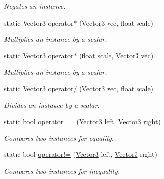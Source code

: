\begin{DoxyCompactItemize}
\begin{DoxyCompactList}\small\item\em Negates an instance. \end{DoxyCompactList}\item 
static \hyperlink{struct_open_t_k_1_1_vector3}{Vector3} \hyperlink{struct_open_t_k_1_1_vector3_a5d752504aac425f88d549e58d71bade2}{operator$\ast$} (\hyperlink{struct_open_t_k_1_1_vector3}{Vector3} vec, float scale)
\begin{DoxyCompactList}\small\item\em Multiplies an instance by a scalar. \end{DoxyCompactList}\item 
static \hyperlink{struct_open_t_k_1_1_vector3}{Vector3} \hyperlink{struct_open_t_k_1_1_vector3_a1fb5158fe548f531205fa3c2f7dff5c3}{operator$\ast$} (float scale, \hyperlink{struct_open_t_k_1_1_vector3}{Vector3} vec)
\begin{DoxyCompactList}\small\item\em Multiplies an instance by a scalar. \end{DoxyCompactList}\item 
static \hyperlink{struct_open_t_k_1_1_vector3}{Vector3} \hyperlink{struct_open_t_k_1_1_vector3_a66ac937445ea5fc1e1a90be086e5d022}{operator/} (\hyperlink{struct_open_t_k_1_1_vector3}{Vector3} vec, float scale)
\begin{DoxyCompactList}\small\item\em Divides an instance by a scalar. \end{DoxyCompactList}\item 
static bool \hyperlink{struct_open_t_k_1_1_vector3_a9b41b0864a92b897a5f9cacfb5f241a9}{operator==} (\hyperlink{struct_open_t_k_1_1_vector3}{Vector3} left, \hyperlink{struct_open_t_k_1_1_vector3}{Vector3} right)
\begin{DoxyCompactList}\small\item\em Compares two instances for equality. \end{DoxyCompactList}\item 
static bool \hyperlink{struct_open_t_k_1_1_vector3_aa8fd533ce6fdd542221814cd0544ddb3}{operator!=} (\hyperlink{struct_open_t_k_1_1_vector3}{Vector3} left, \hyperlink{struct_open_t_k_1_1_vector3}{Vector3} right)
\begin{DoxyCompactList}\small\item\em Compares two instances for inequality. \end{DoxyCompactList}\end{DoxyCompactItemize}
